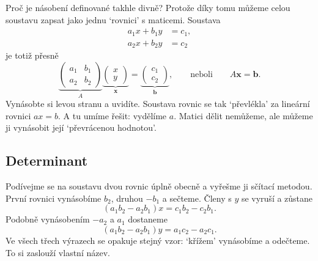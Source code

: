 Proč je násobení definované takhle divně? Protože díky tomu můžeme celou soustavu zapsat jako jednu `rovnici' s maticemi. Soustava
\begin{align*}
  a_1x + b_1y &= c_1,\\
  a_2x + b_2y &= c_2
\end{align*}
je totiž přesně
\begin{equation*}
  \underbrace{\begin{pmatrix} a_1 & b_1\\ a_2 & b_2 \end{pmatrix}}_{A}
  \underbrace{\begin{pmatrix} x\\ y \end{pmatrix}}_{\mathbf{x}}
  =
  \underbrace{\begin{pmatrix} c_1\\ c_2 \end{pmatrix}}_{\mathbf{b}},
  \qquad\text{neboli}\qquad A\mathbf{x} = \mathbf{b}.
\end{equation*}
Vynásobte si levou stranu a uvidíte. Soustava rovnic se tak `převlékla' za lineární rovnici $ax = b$. A tu umíme řešit: vydělíme $a$. Matici dělit nemůžeme, ale můžeme ji vynásobit její `převrácenou hodnotou'.

\subsection{Determinant}\label{sec:determinant}

Podívejme se na soustavu dvou rovnic úplně obecně a vyřešme ji sčítací metodou. První rovnici vynásobíme $b_2$, druhou $-b_1$ a sečteme. Členy s $y$ se vyruší a zůstane
\begin{equation*}
  (a_1b_2 - a_2b_1)x = c_1b_2 - c_2b_1.
\end{equation*}
Podobně vynásobením $-a_2$ a $a_1$ dostaneme
\begin{equation*}
  (a_1b_2 - a_2b_1)y = a_1c_2 - a_2c_1.
\end{equation*}
Ve všech třech výrazech se opakuje stejný vzor: `křížem' vynásobíme a odečteme. To si zaslouží vlastní název.

